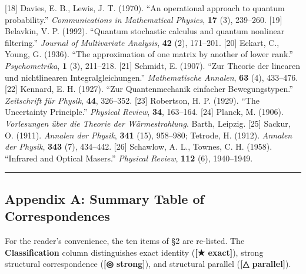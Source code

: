 \documentclass[
]{article}
\begin{document}
{[}18{]} Davies, E. B., Lewis, J. T. (1970). ``An operational approach
to quantum probability.'' \emph{Communications in Mathematical Physics},
\textbf{17} (3), 239--260. {[}19{]} Belavkin, V. P. (1992). ``Quantum
stochastic calculus and quantum nonlinear filtering.'' \emph{Journal of
Multivariate Analysis}, \textbf{42} (2), 171--201. {[}20{]} Eckart, C.,
Young, G. (1936). ``The approximation of one matrix by another of lower
rank.'' \emph{Psychometrika}, \textbf{1} (3), 211--218. {[}21{]}
Schmidt, E. (1907). ``Zur Theorie der linearen und nichtlinearen
Integralgleichungen.'' \emph{Mathematische Annalen}, \textbf{63} (4),
433--476. {[}22{]} Kennard, E. H. (1927). ``Zur Quantenmechanik
einfacher Bewegungstypen.'' \emph{Zeitschrift für Physik}, \textbf{44},
326--352. {[}23{]} Robertson, H. P. (1929). ``The Uncertainty
Principle.'' \emph{Physical Review}, \textbf{34}, 163--164. {[}24{]}
Planck, M. (1906). \emph{Vorlesungen über die Theorie der
Wärmestrahlung}. Barth, Leipzig. {[}25{]} Sackur, O. (1911).
\emph{Annalen der Physik}, \textbf{341} (15), 958--980; Tetrode, H.
(1912). \emph{Annalen der Physik}, \textbf{343} (7), 434--442. {[}26{]}
Schawlow, A. L., Townes, C. H. (1958). ``Infrared and Optical Masers.''
\emph{Physical Review}, \textbf{112} (6), 1940--1949.

\begin{center}\rule{0.5\linewidth}{0.5pt}\end{center}

\subsection{Appendix A: Summary Table of
Correspondences}\label{appendix-a-summary-table-of-correspondences}

For the reader's convenience, the ten items of §2 are re-listed. The
\textbf{Classification} column distinguishes exact identity
(\textbf{{[}★ exact{]}}), strong structural correspondence (\textbf{{[}◎
strong{]}}), and structural parallel (\textbf{{[}△ parallel{]}}).
\end{document}
